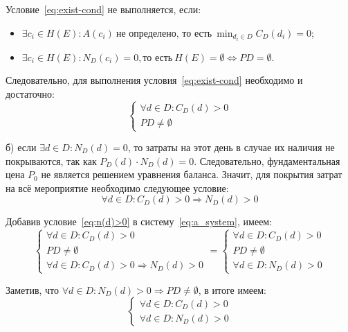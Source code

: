 Условие~\ref{eq:exist-cond} не выполняется, если:
\begin{itemize}[label=--]
	\item $\exists c_i \in H(E): A(c_i) \ \text{не определено, то есть} \ \min_{d_i \in D}{C_D(d_i)} = 0$;
	\item $\exists c_i \in H(E): N_D(c_i) = 0, \text{то есть} \ H(E) = \emptyset \Leftrightarrow PD = \emptyset$.
\end{itemize}

Следовательно, для выполнения условия~\ref{eq:exist-cond} необходимо и достаточно:
\begin{equation}
	\begin{cases}
		\forall d \in D: C_D(d) > 0 \\
		PD \ne \emptyset
	\end{cases}
	\label{eq:a_system}
\end{equation}

б) если $\exists d \in D: N_D(d) = 0$, то затраты на этот день в случае их наличия не покрываются, так как $P_D(d) \cdot N_D(d) = 0$. Следовательно, фундаментальная цена $P_0$ не является решением уравнения баланса. Значит, для покрытия затрат на всё мероприятие необходимо следующее условие:
\begin{equation}
	\forall d \in D: C_D(d) > 0 \Rightarrow N_D(d) > 0
	\label{eq:n(d)>0}
\end{equation}

Добавив условие~\ref{eq:n(d)>0} в систему~\ref{eq:a_system}, имеем:
\begin{equation}
	\begin{cases}
		\forall d \in D: C_D(d) > 0 \\
		PD \ne \emptyset \\
		\forall d \in D: C_D(d) > 0 \Rightarrow N_D(d) > 0
	\end{cases} 
	=
	\begin{cases}
		\forall d \in D: C_D(d) > 0 \\
		PD \ne \emptyset \\
		\forall d \in D: N_D(d) > 0
	\end{cases}
\end{equation}

Заметив, что $\forall d \in D: N_D(d) > 0 \Rightarrow PD \ne \emptyset$, в итоге имеем:
\begin{equation}
	\begin{cases}
		\forall d \in D: C_D(d) > 0 \\
		\forall d \in D: N_D(d) > 0
	\end{cases}
\end{equation}

